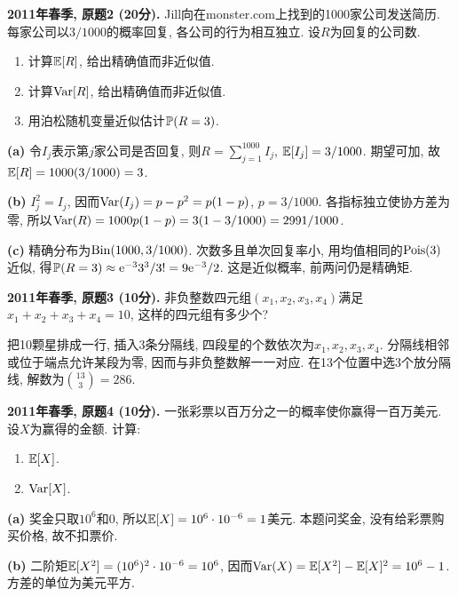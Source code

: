 \begin{exercise}\label{ex:m1-2011s-q2}
\textbf{2011年春季, 原题2 (20分).} Jill向在monster.com上找到的1000家公司发送简历. 每家公司以$3/1000$的概率回复, 各公司的行为相互独立. 设$R$为回复的公司数.
\begin{enumerate}
\item[(a)]\label{ex:m1-2011s-q2-a} 计算$\mathbb E[R]$, 给出精确值而非近似值.
\item[(b)]\label{ex:m1-2011s-q2-b} 计算$\operatorname{Var}[R]$, 给出精确值而非近似值.
\item[(c)]\label{ex:m1-2011s-q2-c} 用泊松随机变量近似估计$\mathbb P(R=3)$.
\end{enumerate}
\end{exercise}
\begin{solution}
\textbf{(a)}\label{sol:m1-2011s-q2-a} 令$I_j$表示第$j$家公司是否回复, 则$R=\sum_{j=1}^{1000}I_j$, $\mathbb E[I_j]=3/1000$. 期望可加, 故$\mathbb E[R]=1000(3/1000)=3$.

\textbf{(b)}\label{sol:m1-2011s-q2-b} $I_j^2=I_j$, 因而$\operatorname{Var}(I_j)=p-p^2=p(1-p)$, $p=3/1000$. 各指标独立使协方差为零, 所以$\operatorname{Var}(R)=1000p(1-p)=3(1-3/1000)=2991/1000$.

\textbf{(c)}\label{sol:m1-2011s-q2-c} 精确分布为$\operatorname{Bin}(1000,3/1000)$. 次数多且单次回复率小, 用均值相同的$\operatorname{Pois}(3)$近似, 得$\mathbb P(R=3)\approx\mathrm e^{-3}3^3/3!=9\mathrm e^{-3}/2$. 这是近似概率, 前两问仍是精确矩.
\end{solution}

\begin{exercise}\label{ex:m1-2011s-q3}
\textbf{2011年春季, 原题3 (10分).} 非负整数四元组$(x_1,x_2,x_3,x_4)$满足$x_1+x_2+x_3+x_4=10$, 这样的四元组有多少个?
\end{exercise}
\begin{solution}
\label{sol:m1-2011s-q3}
把10颗星排成一行, 插入3条分隔线, 四段星的个数依次为$x_1,x_2,x_3,x_4$. 分隔线相邻或位于端点允许某段为零, 因而与非负整数解一一对应. 在13个位置中选3个放分隔线, 解数为$\binom{13}{3}=286$.
\end{solution}

\begin{exercise}\label{ex:m1-2011s-q4}
\textbf{2011年春季, 原题4 (10分).} 一张彩票以百万分之一的概率使你赢得一百万美元. 设$X$为赢得的金额. 计算:
\begin{enumerate}\item[(a)]\label{ex:m1-2011s-q4-a} $\mathbb E[X]$. \item[(b)]\label{ex:m1-2011s-q4-b} $\operatorname{Var}[X]$.\end{enumerate}
\end{exercise}
\begin{solution}
\textbf{(a)}\label{sol:m1-2011s-q4-a} 奖金只取$10^6$和$0$, 所以$\mathbb E[X]=10^6\cdot10^{-6}=1$美元. 本题问奖金, 没有给彩票购买价格, 故不扣票价.

\textbf{(b)}\label{sol:m1-2011s-q4-b} 二阶矩$\mathbb E[X^2]=(10^6)^2\cdot10^{-6}=10^6$, 因而$\operatorname{Var}(X)=\mathbb E[X^2]-\mathbb E[X]^2=10^6-1$. 方差的单位为美元平方.
\end{solution}

